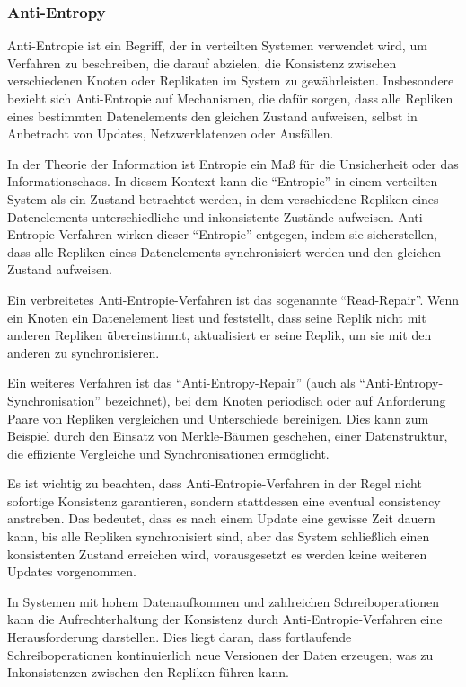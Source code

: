\subsubsection{Anti-Entropy}
Anti-Entropie ist ein Begriff, der in verteilten Systemen verwendet wird, um Verfahren zu beschreiben, die darauf abzielen, die Konsistenz zwischen verschiedenen Knoten oder Replikaten im System zu gewährleisten. Insbesondere bezieht sich Anti-Entropie auf Mechanismen, die dafür sorgen, dass alle Repliken eines bestimmten Datenelements den gleichen Zustand aufweisen, selbst in Anbetracht von Updates, Netzwerklatenzen oder Ausfällen.

In der Theorie der Information ist Entropie ein Maß für die Unsicherheit oder das Informationschaos. In diesem Kontext kann die \enquote{Entropie} in einem verteilten System als ein Zustand betrachtet werden, in dem verschiedene Repliken eines Datenelements unterschiedliche und inkonsistente Zustände aufweisen. Anti-Entropie-Verfahren wirken dieser \enquote{Entropie} entgegen, indem sie sicherstellen, dass alle Repliken eines Datenelements synchronisiert werden und den gleichen Zustand aufweisen.

Ein verbreitetes Anti-Entropie-Verfahren ist das sogenannte \enquote{Read-Repair}. Wenn ein Knoten ein Datenelement liest und feststellt, dass seine Replik nicht mit anderen Repliken übereinstimmt, aktualisiert er seine Replik, um sie mit den anderen zu synchronisieren.

Ein weiteres Verfahren ist das \enquote{Anti-Entropy-Repair} (auch als \enquote{Anti-Entropy-Synchronisation} bezeichnet), bei dem Knoten periodisch oder auf Anforderung Paare von Repliken vergleichen und Unterschiede bereinigen. Dies kann zum Beispiel durch den Einsatz von Merkle-Bäumen geschehen, einer Datenstruktur, die effiziente Vergleiche und Synchronisationen ermöglicht.

Es ist wichtig zu beachten, dass Anti-Entropie-Verfahren in der Regel nicht sofortige Konsistenz garantieren, sondern stattdessen eine eventual consistency anstreben. Das bedeutet, dass es nach einem Update eine gewisse Zeit dauern kann, bis alle Repliken synchronisiert sind, aber das System schließlich einen konsistenten Zustand erreichen wird, vorausgesetzt es werden keine weiteren Updates vorgenommen.

In Systemen mit hohem Datenaufkommen und zahlreichen Schreiboperationen kann die Aufrechterhaltung der Konsistenz durch Anti-Entropie-Verfahren eine Herausforderung darstellen. Dies liegt daran, dass fortlaufende Schreiboperationen kontinuierlich neue Versionen der Daten erzeugen, was zu Inkonsistenzen zwischen den Repliken führen kann.

